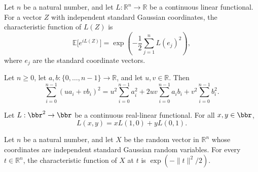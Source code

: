\begin{lemma}
\label{BooleanAnalysis.GaussianSpace.charFunDual_gaussianPi}
\leanok
{}
Let $n$ be a natural number, and let $L:\mathbb R^n\to\mathbb R$ be a continuous linear
functional. For a vector $Z$ with independent standard Gaussian coordinates, the
characteristic function of $L(Z)$ is
\[
\mathbb E\bigl[e^{iL(Z)}\bigr]=\exp\!\left(-\frac12\sum_{j=1}^n L(e_j)^2\right),
\]
where $e_j$ are the standard coordinate vectors.
\end{lemma}

\begin{lemma}
\label{BooleanAnalysis.GaussianSpace.sum_sq_projectionCoefficients}
\leanok
{}
Let $n\ge 0$, let $a,b:\{0,\ldots,n-1\}\to\mathbb R$, and let $u,v\in\mathbb R$. Then
\[\sum_{i=0}^{n-1}(u a_i+v b_i)^2=u^2\sum_{i=0}^{n-1}a_i^2+2uv\sum_{i=0}^{n-1}a_i b_i+v^2\sum_{i=0}^{n-1}b_i^2.\]
\end{lemma}

\begin{lemma}
\label{BooleanAnalysis.GaussianSpace.realLinearFunctional_pair}
\leanok
{}
Let $L:\bbr^2\to\bbr$ be a continuous real-linear functional. For all $x,y\in\bbr$,
\[
L(x,y)=xL(1,0)+yL(0,1).
\]
\end{lemma}

\begin{lemma}
\label{BooleanAnalysis.GaussianSpace.charFun_gaussianEuclidean}
\leanok
{}
Let $n$ be a natural number, and let $X$ be the random vector in $\mathbb R^n$ whose
coordinates are independent standard Gaussian random variables. For every $t\in\mathbb
R^n$, the characteristic function of $X$ at $t$ is $\exp(-\|t\|^2/2)$.
\end{lemma}

